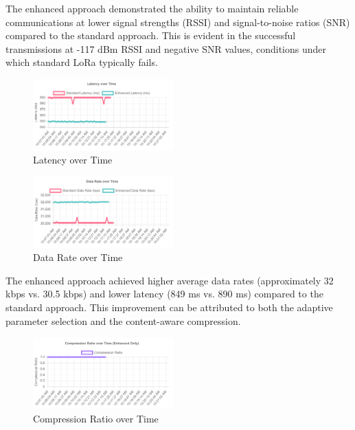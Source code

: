 \documentclass[conference]{IEEEtran}
\begin{document}
The enhanced approach demonstrated the ability to maintain reliable communications at lower signal strengths (RSSI) and signal-to-noise ratios (SNR) compared to the standard approach. This is evident in the successful transmissions at -117 dBm RSSI and negative SNR values, conditions under which standard LoRa typically fails.

\begin{figure}[htbp]
\centering
\includegraphics[width=0.48\textwidth]{images/latency-over-time.png}
\caption{Latency over Time}
\label{fig:latency_time}
\end{figure}

\begin{figure}[htbp]
\centering
\includegraphics[width=0.48\textwidth]{images/data-rate-over-time.png}
\caption{Data Rate over Time}
\label{fig:datarate_time}
\end{figure}

The enhanced approach achieved higher average data rates (approximately 32 kbps vs. 30.5 kbps) and lower latency (849 ms vs. 890 ms) compared to the standard approach. This improvement can be attributed to both the adaptive parameter selection and the content-aware compression.

\begin{figure}[htbp]
\centering
\includegraphics[width=0.48\textwidth]{images/compression-ratio-over-time.png}
\caption{Compression Ratio over Time}
\label{fig:compression_time_ratio}
\end{figure}
\end{document}
